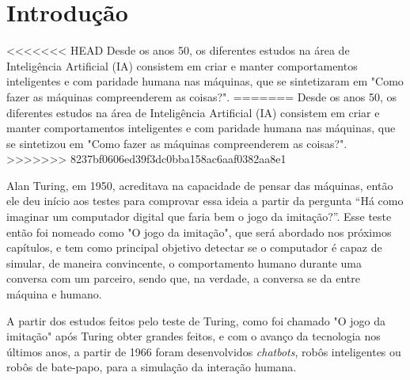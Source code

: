 \documentclass[
	12pt,				%
	oneside,
	a4paper,			%
	english,			%
	french,				%
	spanish,			%
	brazil				%
	]{abntex2}
\begin{document}

\tableofcontents*
\cleardoublepage



\textual

\chapter{Introdução}
<<<<<<< HEAD
Desde os anos 50, os diferentes estudos na área de Inteligência Artificial (IA) consistem em criar e manter comportamentos inteligentes e com paridade humana nas máquinas, que se sintetizaram em "Como fazer as máquinas compreenderem as coisas?"\cite{minsky}.
=======
Desde os anos 50, os diferentes estudos na área de Inteligência Artificial (IA) consistem em criar e manter comportamentos inteligentes e com paridade humana nas máquinas, que se sintetizou em "Como fazer as máquinas compreenderem as coisas?"\cite{minsky}.
>>>>>>> 8237bf0606ed39f3dc0bba158ac6aaf0382aa8e1

Alan Turing, em 1950, acreditava na capacidade de pensar das máquinas, então ele deu início aos testes para comprovar essa ideia a partir da pergunta “Há como imaginar um computador digital que faria bem o jogo da imitação?”. Esse teste então foi nomeado como "O jogo da imitação", que será abordado nos próximos capítulos, e tem como principal objetivo detectar se o computador é capaz de simular, de maneira convincente, o comportamento humano durante uma conversa com um parceiro, sendo que, na verdade, a conversa se da entre máquina e humano.

A partir dos estudos feitos pelo teste de Turing, como foi chamado "O jogo da imitação" após Turing obter grandes feitos, e com o avanço da tecnologia nos últimos anos, a partir de 1966 foram desenvolvidos \emph{chatbots}, robôs inteligentes ou robôs de bate-papo, para a simulação da interação humana. 
\end{document}
